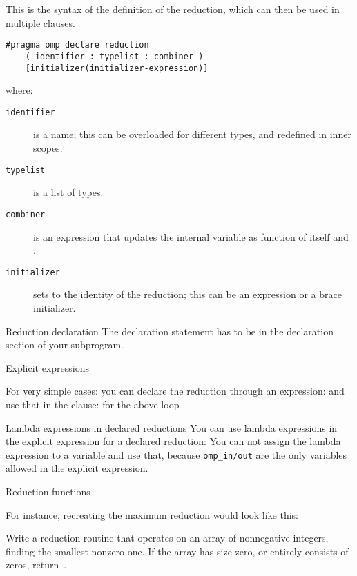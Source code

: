 This is the syntax of the definition of the reduction, which can then
be used in multiple  clauses.
\begin{lstlisting}
#pragma omp declare reduction 
    ( identifier : typelist : combiner )
    [initializer(initializer-expression)]
\end{lstlisting}
where:
\begin{description}
  \item[\texttt{identifier}] is a name; this can be overloaded for
    different types, and redefined in inner scopes.
  \item[\texttt{typelist}] is a list of types.
  \item[\texttt{combiner}] is an expression that updates the internal
    variable  as function of itself and .
  \item[\texttt{initializer}] sets  to the
    identity of the reduction; this
    can be an expression or a brace initializer.
\end{description}

\begin{fortrannote}{Reduction declaration}
  The declaration statement has to be in the declaration section of your subprogram.
\end{fortrannote}

 {Explicit expressions}

For very simple cases:
%
%
you can declare the reduction through an expression:
%
%
and use that in the  clause:
%
%
for the above loop
%

\begin{cppnote}{Lambda expressions in declared reductions}
  You can use lambda expressions in the explicit expression
  for a declared reduction:
  You can not assign the lambda expression to a variable and use that,
  because \lstinline{omp_in/out} are the only variables allowed
  in the explicit expression.
\end{cppnote}

 {Reduction functions}

For instance, recreating the maximum reduction would look like this:
%

\begin{exercise}
  Write a reduction routine that operates on an array of nonnegative
  integers, finding the smallest nonzero one. If the array has size
  zero, or entirely consists of zeros, return~.
\end{exercise}

